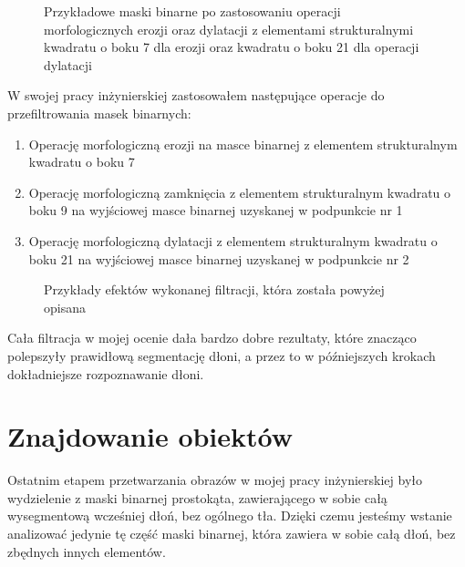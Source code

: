 \documentclass[a4paper,12pt,twoside,openany]{report}
\newcommand{\ImgPath}{.}
\begin{document}
\begin{figure}[H]
	\centering
	\caption{Przykładowe maski binarne po zastosowaniu operacji morfologicznych erozji oraz dylatacji z elementami strukturalnymi kwadratu o boku 7 dla erozji oraz kwadratu o boku 21 dla operacji dylatacji}
\end{figure}

W swojej pracy inżynierskiej zastosowałem następujące operacje do przefiltrowania masek binarnych: 
\begin{enumerate}
	\item Operację morfologiczną erozji na masce binarnej z elementem strukturalnym kwadratu o boku 7
	\item Operację morfologiczną zamknięcia z elementem strukturalnym kwadratu o boku 9 na wyjściowej masce binarnej uzyskanej w podpunkcie nr 1
	\item Operację morfologiczną dylatacji z elementem strukturalnym kwadratu o boku 21 na wyjściowej masce binarnej uzyskanej w podpunkcie nr 2
\end{enumerate}

\begin{figure}[H]
	\centering
	\caption{Przykłady efektów wykonanej filtracji, która została powyżej opisana}
\end{figure}

Cała filtracja  w mojej ocenie dała bardzo dobre rezultaty, które znacząco polepszyły prawidłową segmentację dłoni, a przez to w późniejszych krokach dokładniejsze rozpoznawanie dłoni.

\section{Znajdowanie obiektów}
Ostatnim etapem przetwarzania obrazów w mojej pracy inżynierskiej było wydzielenie z maski binarnej prostokąta, zawierającego w sobie całą wysegmentową wcześniej dłoń, bez ogólnego tła. Dzięki czemu jesteśmy wstanie analizować jedynie tę część maski binarnej, która zawiera w sobie całą dłoń, bez zbędnych innych elementów.
\end{document}
